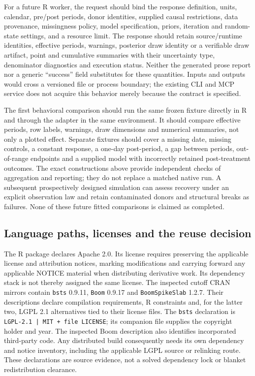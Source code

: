 For a future R worker, the request should bind the response definition,
units, calendar, pre/post periods, donor identities, supplied causal
restrictions, data provenance, missingness policy, model specification,
priors, iteration and random-state settings, and a resource limit. The
response should retain source/runtime identities, effective periods,
warnings, posterior draw identity or a verifiable draw artifact, point and
cumulative summaries with their uncertainty type, denominator diagnostics
and execution status. Neither the generated prose report nor a generic
``success'' field substitutes for these quantities. Inputs and outputs would
cross a versioned file or process boundary; the existing CLI and MCP service
does not acquire this behavior merely because the contract is specified.
\cite{exec13_ci_reuse}

The first behavioral comparison should run the same frozen fixture directly
in R and through the adapter in the same environment. It should compare
effective periods, row labels, warnings, draw dimensions and numerical
summaries, not only a plotted effect. Separate fixtures should cover a missing
date, missing controls, a constant response, a one-day post-period, a gap
between periods, out-of-range endpoints and a supplied model with incorrectly
retained post-treatment outcomes. The exact constructions above provide
independent checks of aggregation and reporting; they do not replace a
matched native run. A subsequent prospectively designed simulation can
assess recovery under an explicit observation law and retain contaminated
donors and structural breaks as failures. None of these future fitted
comparisons is claimed as completed.\cite{exec13_ci_reuse}

\subsection{Language paths, licenses and the reuse decision}

The R package declares Apache 2.0. Its license requires preserving the
applicable license and attribution notices, marking modifications and
carrying forward any applicable NOTICE material when distributing derivative
work. Its dependency stack is not thereby assigned the same license. The
inspected cutoff CRAN mirrors contain \texttt{bsts} 0.9.11,
\texttt{Boom} 0.9.17 and \texttt{BoomSpikeSlab} 1.2.7. Their descriptions
declare compilation requirements, R constraints and, for the latter two,
LGPL 2.1 alternatives tied to their license files. The \texttt{bsts}
declaration is \texttt{LGPL-2.1 | MIT + file LICENSE}; its companion file
supplies the copyright holder and year. The inspected Boom description also
identifies incorporated third-party code. Any distributed build consequently
needs its own dependency and notice inventory, including the applicable
LGPL source or relinking route. These declarations are source evidence, not
a solved dependency lock or blanket redistribution clearance.
\cite{exec13_ci_r,exec13_ci_dependencies}

